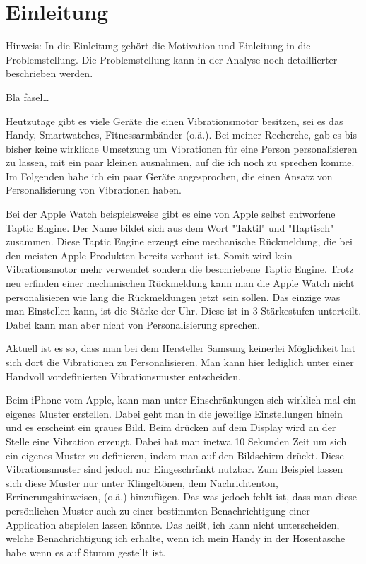 
\chapter{Einleitung}
\label{ch:Einleitung}
Hinweis: In die Einleitung gehört die Motivation 
und Einleitung in die Problemstellung. Die Problemstellung
kann in der Analyse noch detaillierter beschrieben werden.

Bla fasel\ldots

Heutzutage gibt es viele Geräte die einen Vibrationsmotor besitzen, sei es das Handy, Smartwatches, Fitnessarmbänder (o.ä.). Bei meiner Recherche, gab es bis bisher keine wirkliche Umsetzung um Vibrationen für eine Person personalisieren zu lassen, mit ein paar kleinen ausnahmen, auf die ich noch zu sprechen komme. Im Folgenden habe ich ein paar Geräte angesprochen, die einen Ansatz von Personalisierung von Vibrationen haben.

Bei der Apple Watch beispielsweise gibt es eine von Apple selbst entworfene Taptic Engine. Der Name bildet sich aus dem Wort "Taktil" und "Haptisch" zusammen. Diese Taptic Engine erzeugt eine mechanische Rückmeldung, die bei den meisten Apple Produkten bereits verbaut ist. Somit wird kein Vibrationsmotor mehr verwendet sondern die beschriebene Taptic Engine. Trotz neu erfinden einer mechanischen Rückmeldung kann man die Apple Watch nicht personalisieren wie lang die Rückmeldungen jetzt sein sollen. Das einzige was man Einstellen kann, ist die Stärke der Uhr. Diese ist in 3 Stärkestufen unterteilt. Dabei kann man aber nicht von Personalisierung sprechen. 

Aktuell ist es so, dass man bei dem Hersteller Samsung keinerlei Möglichkeit hat sich dort die Vibrationen zu Personalisieren. Man kann hier lediglich unter einer Handvoll vordefinierten Vibrationsmuster entscheiden. 

Beim iPhone vom Apple, kann man unter Einschränkungen sich wirklich mal ein eigenes Muster erstellen. Dabei geht man in die jeweilige Einstellungen hinein und es erscheint ein graues Bild. Beim drücken auf dem Display wird an der Stelle eine Vibration erzeugt. Dabei hat man inetwa 10 Sekunden Zeit um sich ein eigenes Muster zu definieren, indem man auf den Bildschirm drückt. Diese Vibrationsmuster sind jedoch nur Eingeschränkt nutzbar. Zum Beispiel lassen sich diese Muster nur unter Klingeltönen, dem Nachrichtenton, Errinerungshinweisen, (o.ä.) hinzufügen. Das was jedoch fehlt ist, dass man diese persönlichen Muster auch zu einer bestimmten Benachrichtigung einer Application abspielen lassen könnte. Das heißt, ich kann nicht unterscheiden, welche Benachrichtigung ich erhalte, wenn ich mein Handy in der Hosentasche habe wenn es auf Stumm gestellt ist. 

